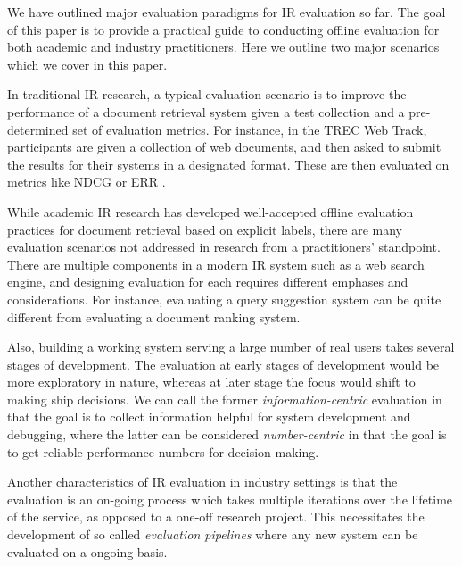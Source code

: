 
We have outlined major evaluation paradigms for IR evaluation so far. The goal of this paper is to provide a practical guide to conducting offline evaluation for both academic and industry practitioners. Here we outline two major scenarios which we cover in this paper.

In traditional IR research, a typical evaluation scenario is to improve the performance of a document retrieval system given a test collection and a pre-determined set of evaluation metrics. For instance, in the TREC Web Track, participants are given a collection of web documents, and then asked to submit the results for their systems in a designated format. These are then evaluated on metrics like NDCG \citep{Jarvelin:2002} or ERR \citep{ChapelleMZG09}.

While academic IR research has developed well-accepted offline evaluation practices for document retrieval based on explicit labels, there are many evaluation scenarios not addressed in research from a practitioners' standpoint. There are multiple components in a modern IR system such as a web search engine, and designing evaluation for each requires different emphases and considerations. For instance, evaluating a query suggestion system can be quite different from evaluating a document ranking system. %

Also, building a working system serving a large number of real users takes several stages of development. The evaluation at early stages of development would be more exploratory in nature, whereas at later stage the focus would shift to making ship decisions. We can call the former \textit{information-centric} evaluation in that the goal is to collect information helpful for system development and debugging, where the latter can be considered \textit{number-centric} in that the goal is to get reliable performance numbers for decision making.

Another characteristics of IR evaluation in industry settings is that the evaluation is an on-going process which takes multiple iterations over the lifetime of the service, as opposed to a one-off research project. This necessitates the development of so called \textit{evaluation pipelines} where any new system can be evaluated on a ongoing basis.

